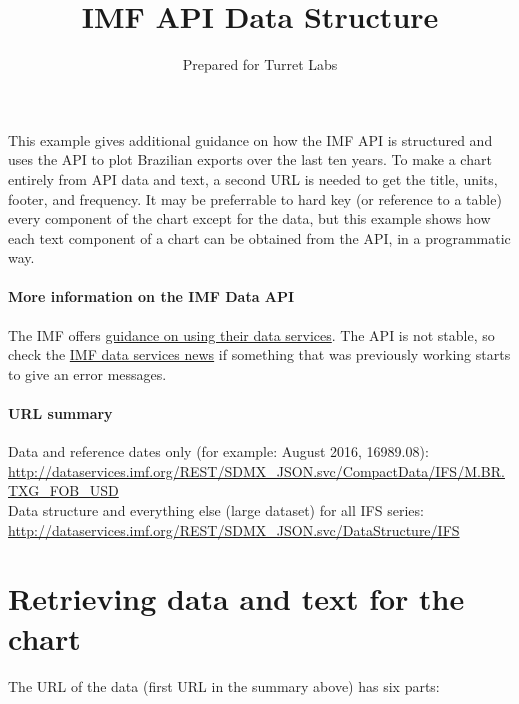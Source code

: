 \documentclass{article}
\title{IMF API Data Structure}
\author{Prepared for Turret Labs}
\begin{document}
    
    
    \maketitle
    
    

This example gives additional guidance on how the IMF API is structured
and uses the API to plot Brazilian exports over the last ten years. To
make a chart entirely from API data and text, a second URL is needed to get
the title, units, footer, and frequency. It may be preferrable to hard
key (or reference to a table) every component of the chart except for
the data, but this example shows how each text component of a chart can be
obtained from the API, in a programmatic way.

\paragraph{More information on the IMF Data
API}\label{more-information-on-the-imf-data-api}

The IMF offers
\href{http://datahelp.imf.org/knowledgebase/articles/630877-data-services}{guidance
on using their data services}. The API is not stable, so check the
\href{http://data.imf.org/?sk=A329021F-1ED6-4D6E-B719-5BF5413923B6}{IMF
data services news} if something that was previously working starts to
give an error messages.

\paragraph{URL
summary}\label{brazil-exampleurl-summary}
Data and reference dates only (for example: August 2016, 16989.08):\\
\url{http://dataservices.imf.org/REST/SDMX\_JSON.svc/CompactData/IFS/M.BR.TXG\_FOB\_USD} \\
Data structure and everything else (large dataset) for all IFS series:\\
\url{http://dataservices.imf.org/REST/SDMX\_JSON.svc/DataStructure/IFS}

    \section{Retrieving data and text for the
chart}\label{retrieving-data-for-the-chart}

The URL of the data (first URL in the summary above) has six parts:
\end{document}
